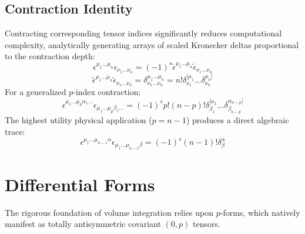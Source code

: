 \documentclass[11pt, a4paper]{report}
\begin{document}
\subsection*{Contraction Identity}
Contracting corresponding tensor indices significantly reduces computational complexity, analytically generating arrays of scaled Kronecker deltas proportional to the contraction depth:
\begin{equation} \epsilon^{\mu_1\dots\mu_n} \epsilon_{\nu_1\dots\nu_n} = (-1)^s \tilde{\epsilon}^{\mu_1\dots\mu_n} \tilde{\epsilon}_{\nu_1\dots\nu_n} \end{equation}
\begin{equation} \tilde{\epsilon}^{\mu_1\dots\mu_n} \tilde{\epsilon}_{\nu_1\dots\nu_n} = \delta^{\mu_1\dots\mu_n}_{\nu_1\dots\nu_n} = n! \delta^{[\mu_1}_{\nu_1} \dots \delta^{\mu_n]}_{\nu_n} \end{equation}
For a generalized $p$-index contraction:
\begin{equation} \epsilon^{\mu_1\dots\mu_p\alpha_1\dots} \epsilon_{\mu_1\dots\mu_p\beta_1\dots} = (-1)^s p!(n-p)! \delta^{[\alpha_1}_{\beta_1} \dots \delta^{\alpha_{n-p}]}_{\beta_{n-p}} \end{equation}
The highest utility physical application ($p=n-1$) produces a direct algebraic trace:
\begin{equation} \epsilon^{\mu_1\dots\mu_{n-1}\alpha} \epsilon_{\mu_1\dots\mu_{n-1}\beta} = (-1)^s (n-1)! \delta^\alpha_\beta \end{equation}

\section{Differential Forms}
The rigorous foundation of volume integration relies upon $p$-forms, which natively manifest as totally antisymmetric covariant $(0,p)$ tensors.
\end{document}
